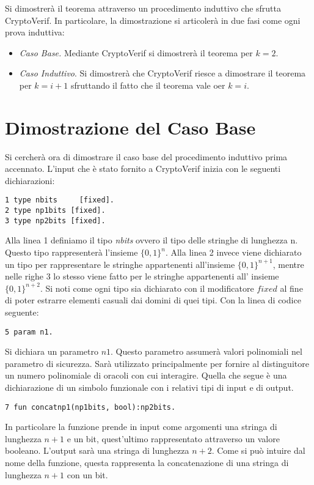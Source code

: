 \documentclass[a4paper,openright,twoside,12pt]{report}
\begin{document}
Si dimostrer\`a il teorema attraverso un procedimento induttivo che sfrutta CryptoVerif. 
In particolare, la dimostrazione si articoler\`a in due fasi come ogni prova induttiva:
\begin{itemize}
 \item \emph{Caso Base.} Mediante CryptoVerif si dimostrer\`a il teorema per $k=2$.
 \item \emph{Caso Induttivo}. Si dimostrer\`a che CryptoVerif riesce a dimostrare il teorema per $k=i+1$ sfruttando il fatto che il teorema vale oer $k=i$.
\end{itemize}


\newpage
\section{Dimostrazione del Caso Base}
Si cercher\`a ora di dimostrare il caso base del procedimento induttivo prima accennato.
L'input che \`e stato fornito a CryptoVerif inizia con le seguenti dichiarazioni:
\begin{verbatim}
1 type nbits 	 [fixed].     
2 type np1bits [fixed].   
3 type np2bits [fixed].   
\end{verbatim}
Alla linea 1 definiamo il tipo \emph{nbits} ovvero il tipo delle stringhe di lunghezza n. Questo tipo rappresenter\`a l'insieme $\{0, 1\}^n$. Alla linea 2 invece viene dichiarato un tipo
per rappresentare le stringhe appartenenti all'insieme $\{0, 1\}^{n+1}$, mentre nelle righe 3 lo stesso viene fatto per le stringhe
appartenenti all' insieme $\{0, 1\}^{n+2}$. Si noti come ogni tipo sia dichiarato con il modificatore $fixed$ al fine di poter estrarre elementi casuali dai domini di quei tipi.
Con la linea di codice seguente:
\begin{verbatim}
5 param n1.
\end{verbatim}
Si dichiara un parametro $n1$. Questo parametro assumer\`a valori polinomiali nel parametro di sicurezza. 
Sar\`a utilizzato principalmente per fornire al distinguitore un numero polinomiale di oracoli con cui interagire.
Quella che segue \`e una dichiarazione di un simbolo funzionale con i relativi tipi di input e di output.
\begin{verbatim}  
7 fun concatnp1(np1bits, bool):np2bits.
\end{verbatim}
In particolare la funzione prende in input come argomenti una stringa di lunghezza $n+1$ e un bit, quest'ultimo rappresentato attraverso
un valore booleano. L'output sar\`a una stringa di lunghezza $n+2$.
Come si pu\`o intuire dal nome della funzione, questa rappresenta la concatenazione di una stringa di lunghezza $n+1$ con un bit.
\end{document}
